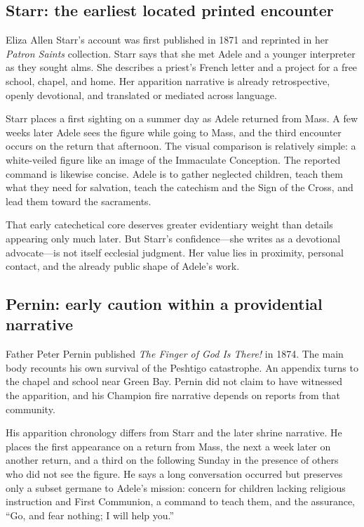 \subsection{Starr: the earliest located printed encounter}

Eliza Allen Starr's account was first published in 1871 and reprinted in her \emph{Patron Saints} collection. Starr says that she met Adele and a younger interpreter as they sought alms. She describes a priest's French letter and a project for a free school, chapel, and home. Her apparition narrative is already retrospective, openly devotional, and translated or mediated across language.

Starr places a first sighting on a summer day as Adele returned from Mass. A few weeks later Adele sees the figure while going to Mass, and the third encounter occurs on the return that afternoon. The visual comparison is relatively simple: a white-veiled figure like an image of the Immaculate Conception. The reported command is likewise concise. Adele is to gather neglected children, teach them what they need for salvation, teach the catechism and the Sign of the Cross, and lead them toward the sacraments.

That early catechetical core deserves greater evidentiary weight than details appearing only much later. But Starr's confidence---she writes as a devotional advocate---is not itself ecclesial judgment. Her value lies in proximity, personal contact, and the already public shape of Adele's work.

\subsection{Pernin: early caution within a providential narrative}

Father Peter Pernin published \emph{The Finger of God Is There!} in 1874. The main body recounts his own survival of the Peshtigo catastrophe. An appendix turns to the chapel and school near Green Bay. Pernin did not claim to have witnessed the apparition, and his Champion fire narrative depends on reports from that community.

His apparition chronology differs from Starr and the later shrine narrative. He places the first appearance on a return from Mass, the next a week later on another return, and a third on the following Sunday in the presence of others who did not see the figure. He says a long conversation occurred but preserves only a subset germane to Adele's mission: concern for children lacking religious instruction and First Communion, a command to teach them, and the assurance, “Go, and fear nothing; I will help you.”

